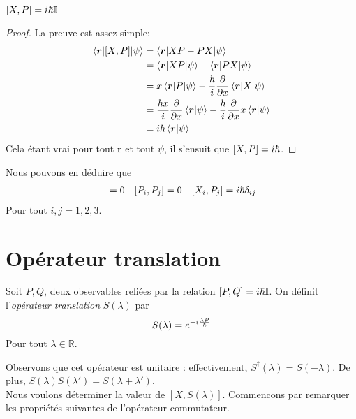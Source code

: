 \documentclass[../Notesdecours.tex]{subfiles}
\begin{document}
\begin{Property} $[X,P] = i\hbar\mathbb{I}$ \end{Property}
\begin{proof}
La preuve est assez simple:
\begin{align*}
	\braket{\bm{r}|[X,P]|\psi} &= \braket{\bm{r}|XP-PX|\psi}\\
	&= \braket{\bm{r}|XP|\psi} - \braket{\bm{r}|PX|\psi}\\
	&= x\braket{\bm{r}|P|\psi} -\frac{\hbar}{i}\frac{\partial}{\partial x}\braket{\bm{r}|X|\psi}\\
	&= \frac{\hbar x}{i}\frac{\partial}{\partial x}\braket{\bm{r}|\psi} - \frac{\hbar}{i} \frac{\partial}{\partial x}x\braket{\bm{r}|\psi}\\
	&= i\hbar \braket{\bm{r}|\psi}
\end{align*}
Cela étant vrai pour tout $\bm{r}$ et tout $\psi$, il s'ensuit que $[X,P] = i\hbar$.
\end{proof}
Nous pouvons en déduire que 
\begin{align}
[X_i,X_j] &= 0 & [P_i,P_j] &= 0 & [X_i,P_j] = i\h\delta_{ij}
\end{align}
Pour tout $i,j = 1,2,3$.

\section{Opérateur translation}
\begin{definition}
	Soit $P,Q$, deux observables reliées par la relation $[P,Q] = i\hbar\mathbb{I}$. On définit l'\emph{opérateur translation} $S(\lambda)$ par
	\begin{equation}
		S(\lambda) = e^{-i\frac{\lambda P}{\hbar}}
	\end{equation}
	Pour tout $\lambda\in\mathbb{R}$.
\end{definition}
Observons que cet opérateur est unitaire : effectivement, $S^\dagger (\lambda) = S(-\lambda)$. De plus, $S(\lambda)S(\lambda') = S(\lambda + \lambda')$.\\

Nous voulons déterminer la valeur de $[X,S(\lambda)]$. Commencons par remarquer les propriétés suivantes de l'opérateur commutateur.
\end{document}

